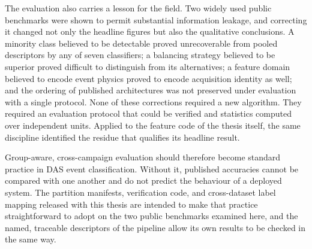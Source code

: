 The evaluation also carries a lesson for the field. Two widely used public benchmarks were shown to permit substantial information leakage, and correcting it changed not only the headline figures but also the qualitative conclusions. A minority class believed to be detectable proved unrecoverable from pooled descriptors by any of seven classifiers; a balancing strategy believed to be superior proved difficult to distinguish from its alternatives; a feature domain believed to encode event physics proved to encode acquisition identity as well; and the ordering of published architectures was not preserved under evaluation with a single protocol. None of these corrections required a new algorithm. They required an evaluation protocol that could be verified and statistics computed over independent units. Applied to the feature code of the thesis itself, the same discipline identified the residue that qualifies its headline result.

Group-aware, cross-campaign evaluation should therefore become standard practice in DAS event classification. Without it, published accuracies cannot be compared with one another and do not predict the behaviour of a deployed system. The partition manifests, verification code, and cross-dataset label mapping released with this thesis are intended to make that practice straightforward to adopt on the two public benchmarks examined here, and the named, traceable descriptors of the pipeline allow its own results to be checked in the same way.
